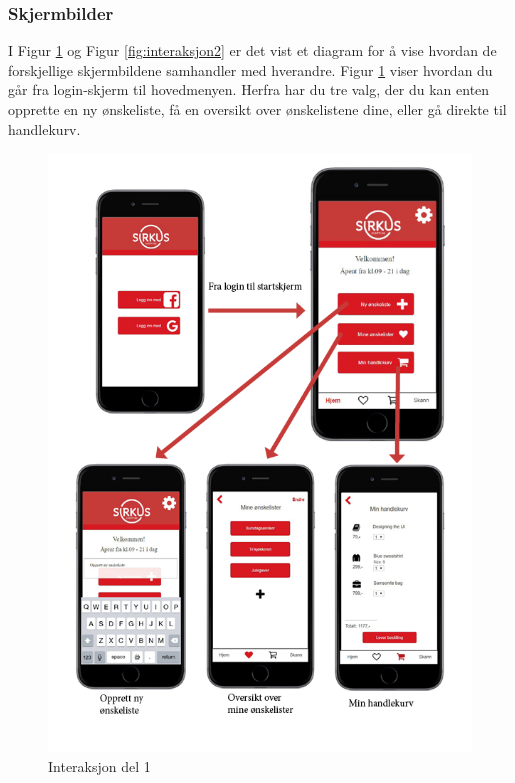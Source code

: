 \subsubsection{Skjermbilder}
I Figur \ref{fig:interaksjon1} og Figur \ref{fig:interaksjon2} er det vist et diagram for å vise hvordan de forskjellige skjermbildene samhandler med hverandre. Figur \ref{fig:interaksjon1} viser hvordan du går fra login-skjerm til hovedmenyen. Herfra har du tre valg, der du kan enten opprette en ny ønskeliste, få en oversikt over ønskelistene dine, eller gå direkte til handlekurv. 

\begin{figure}[H]
\includegraphics[scale=0.70]{images/axurebilder/axure-interaksjon.png}
\centering %
\caption{Interaksjon del 1}
\label{fig:interaksjon1}
\end{figure}

